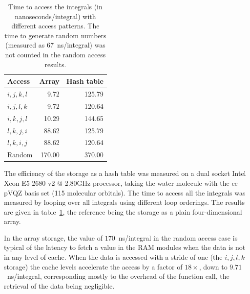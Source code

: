 \documentclass[./thesis.tex]{subfiles}
\begin{document}
\begin{table}
\caption{Time to access the integrals (in nanoseconds/integral) with different access patterns. The time to generate random numbers (measured as 67~ns/integral) was not counted in the random access results.}
\label{tab:integrals}
\begin{center}
  \begin{tabular}{lrr}
    \hline
   Access  & Array  & Hash table  \\ 
\hline
 $i,j,k,l$ &  9.72  &  125.79     \\ 
 $i,j,l,k$ &  9.72  &  120.64     \\ 
 $i,k,j,l$ & 10.29  &  144.65     \\ 
 $l,k,j,i$ & 88.62  &  125.79     \\ 
 $l,k,i,j$ & 88.62  &  120.64     \\ 
   Random  & 170.00 &  370.00     \\ 
    \hline
  \end{tabular}
\end{center}
\end{table}



The efficiency of the storage as a hash table was measured on a dual socket Intel Xeon E5-2680 v2 @ 2.80GHz processor, taking the water molecule with the cc-pVQZ basis set (115 molecular orbitals). The time to access all the integrals was measured by looping over all integrals using different loop orderings. The results are given in table~\ref{tab:integrals}, the reference being the storage as a plain four-dimensional array.

In the array storage,
the value of $170$~ns/integral in the random access case is typical of the latency to fetch a value in the RAM modules when the data is not in any level of cache.
When the data is accessed with a stride of one (the $i,j,l,k$ storage) the cache levels accelerate the access by a factor of $18 \times$, down to $9.71$~ns/integral, corresponding mostly to the overhead of the function call, the retrieval of the data being negligible.
\end{document}
